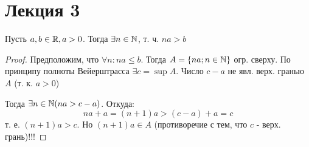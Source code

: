 \section{Лекция 3}

\begin{theorem}
Пусть $a, b \in \mathbb{R}, a > 0$. Тогда $\exists n \in \mathbb{N}$, т. ч. $na > b$
\end{theorem}
\begin{proof}
Предположим, что $\forall n \colon  na \leq b$. Тогда $A = \{na; n \in \mathbb{N}\}$ огр. сверху. По принципу полноты Вейерштрасса $\exists c = \sup A$. Число $c - a$ не явл. верх. гранью $A$ (т. к. $a > 0$)

Тогда $\exists n \in \mathbb{N} (na > c - a)$. Откуда:
\[
na + a = (n + 1)a > (c - a) + a = c 
\] 
т. е. $(n + 1)a > c$. Но $(n + 1)a \in A$ (противоречие с тем, что $c$ - верх. грань)!!!
\end{proof}

